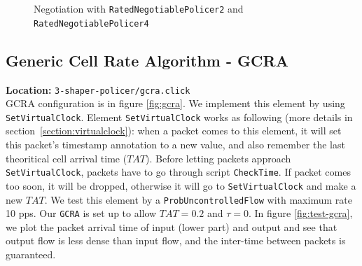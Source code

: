 \documentclass[a4paper]{article}
\begin{document}
    \begin{figure}
    \centering
	    
	    \caption{Negotiation with \texttt{RatedNegotiablePolicer2} and \texttt{RatedNegotiablePolicer4}}
	    \label{fig:negotiation-test}
    \end{figure}

  \subsection{Generic Cell Rate Algorithm - GCRA}
  \textbf{Location:} \texttt{3-shaper-policer/gcra.click} \\
  GCRA configuration is in figure \ref{fig:gcra}. We implement this element by using \texttt{SetVirtualClock}. Element \texttt{SetVirtualClock} works as following (more details in section~\ref{section:virtualclock}): when a packet comes to this element, it will set this packet's timestamp annotation to a new value, and also remember the last theoritical cell arrival time ($TAT$). Before letting packets approach \texttt{SetVirtualClock}, packets have to go through script \texttt{CheckTime}. If packet comes too soon, it will be dropped, otherwise it will go to \texttt{SetVirtualClock} and make a new $TAT$. We test this element by a \texttt{ProbUncontrolledFlow} with maximum rate 10 pps. Our \texttt{GCRA} is set up to allow $TAT = 0.2$ and $\tau = 0$. In figure \ref{fig:test-gcra}, we plot the packet arrival time of input (lower part) and output and see that output flow is less dense than input flow, and the inter-time between packets is guaranteed. 
\end{document}

